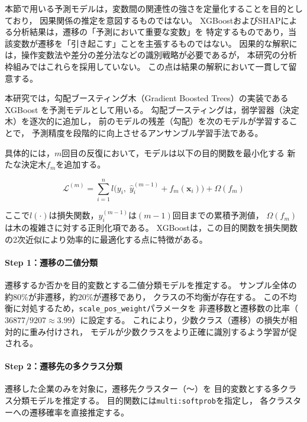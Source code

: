 本節で用いる予測モデルは，変数間の関連性の強さを定量化することを目的としており，
因果関係の推定を意図するものではない。
XGBoostおよびSHAPによる分析結果は，遷移の「予測において重要な変数」を
特定するものであり，当該変数が遷移を「引き起こす」ことを主張するものではない。
因果的な解釈には，操作変数法や差分の差分法などの識別戦略が必要であるが，
本研究の分析枠組みではこれらを採用していない。
この点は結果の解釈において一貫して留意する。

本研究では，勾配ブースティング木（Gradient Boosted Trees）の実装である
XGBoost \citep{ChenGuestrin2016}を予測モデルとして用いる。
勾配ブースティングは，弱学習器（決定木）を逐次的に追加し，
前のモデルの残差（勾配）を次のモデルが学習することで，
予測精度を段階的に向上させるアンサンブル学習手法である。

具体的には，$m$回目の反復において，モデルは以下の目的関数を最小化する
新たな決定木$f_m$を追加する。

\begin{equation}
  \mathcal{L}^{(m)} = \sum_{i=1}^{n} l\bigl(y_i,\; \hat{y}_i^{(m-1)} + f_m(\mathbf{x}_i)\bigr)
  + \Omega(f_m)
  \label{eq:xgb-objective}
\end{equation}

ここで$l(\cdot)$は損失関数，$\hat{y}_i^{(m-1)}$は$(m-1)$回目までの累積予測値，
$\Omega(f_m)$は木の複雑さに対する正則化項である。
XGBoostは，この目的関数を損失関数の2次近似により効率的に最適化する点に特徴がある。

\paragraph{Step 1：遷移の二値分類}

遷移するか否かを目的変数とする二値分類モデルを推定する。
サンプル全体の約80\%が非遷移，約20\%が遷移であり，
クラスの不均衡が存在する。
この不均衡に対処するため，\texttt{scale\_pos\_weight}パラメータを
非遷移数と遷移数の比率（$\num{36877} / \num{9207} \approx 3.99$）に設定する。
これにより，少数クラス（遷移）の損失が相対的に重み付けされ，
モデルが少数クラスをより正確に識別するよう学習が促される。

\paragraph{Step 2：遷移先の多クラス分類}

遷移した企業のみを対象に，遷移先クラスター（〜）を
目的変数とする多クラス分類モデルを推定する。
目的関数には\texttt{multi:softprob}を指定し，
各クラスターへの遷移確率を直接推定する。

